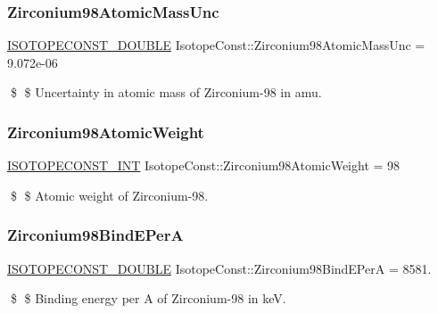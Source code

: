 \subsubsection{\texorpdfstring{Zirconium98\+Atomic\+Mass\+Unc}{Zirconium98AtomicMassUnc}}
{\footnotesize\ttfamily \mbox{\hyperlink{group___isotope_const-_macros_ga8f45a7272ce02c0b4c65c44636ed719a}{I\+S\+O\+T\+O\+P\+E\+C\+O\+N\+S\+T\+\_\+\+D\+O\+U\+B\+LE}} Isotope\+Const\+::\+Zirconium98\+Atomic\+Mass\+Unc = 9.\+072e-\/06}

\$ \$ Uncertainty in atomic mass of Zirconium-\/98 in amu. \mbox{\label{group___isotope_const-_zirconium-_zr98_gadbd544c54c41fcd06b6ffdb3788e5f24}} 
\subsubsection{\texorpdfstring{Zirconium98\+Atomic\+Weight}{Zirconium98AtomicWeight}}
{\footnotesize\ttfamily \mbox{\hyperlink{group___isotope_const-_macros_ga5f18360b3e99483a35c32d789e62621c}{I\+S\+O\+T\+O\+P\+E\+C\+O\+N\+S\+T\+\_\+\+I\+NT}} Isotope\+Const\+::\+Zirconium98\+Atomic\+Weight = 98}

\$ \$ Atomic weight of Zirconium-\/98. \mbox{\label{group___isotope_const-_zirconium-_zr98_ga39caa8e9a1e6456b32e9372370e3f4d3}} 
\subsubsection{\texorpdfstring{Zirconium98\+Bind\+E\+PerA}{Zirconium98BindEPerA}}
{\footnotesize\ttfamily \mbox{\hyperlink{group___isotope_const-_macros_ga8f45a7272ce02c0b4c65c44636ed719a}{I\+S\+O\+T\+O\+P\+E\+C\+O\+N\+S\+T\+\_\+\+D\+O\+U\+B\+LE}} Isotope\+Const\+::\+Zirconium98\+Bind\+E\+PerA = 8581.}

\$ \$ Binding energy per A of Zirconium-\/98 in keV. \mbox{\label{group___isotope_const-_zirconium-_zr98_ga880751acf32776a76fe1de0c6e77a870}} 

